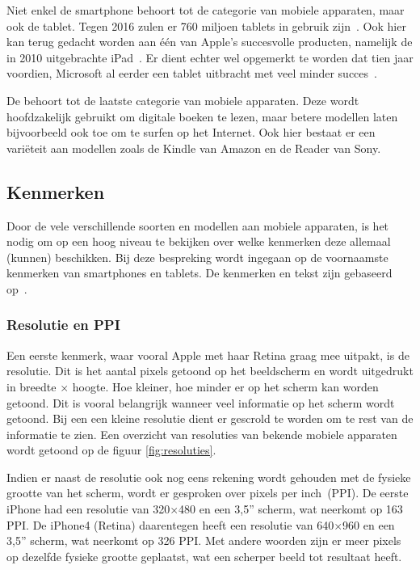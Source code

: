Niet enkel de smartphone behoort tot de categorie van mobiele apparaten, maar ook de tablet. 
Tegen 2016 zulen er 760 miljoen tablets in gebruik zijn~\cite{Gillett2012}.
Ook hier kan terug gedacht worden aan één van Apple's succesvolle producten, namelijk de in 2010 uitgebrachte iPad~\cite{Apple2010}. 
Er dient echter wel opgemerkt te worden dat tien jaar voordien, Microsoft al eerder een tablet uitbracht met veel minder succes~\cite{Microsoft2000}.

De  behoort tot de laatste categorie van mobiele apparaten. 
Deze wordt hoofdzakelijk gebruikt om digitale boeken te lezen, maar betere modellen laten bijvoorbeeld ook toe om te surfen op het Internet. 
Ook hier bestaat er een variëteit aan modellen zoals de Kindle van Amazon en de Reader van Sony.

\subsection{Kenmerken}
Door de vele verschillende soorten en modellen aan mobiele apparaten, is het nodig om op een hoog niveau te bekijken over welke kenmerken deze allemaal (kunnen) beschikken. 
Bij deze bespreking wordt ingegaan op de voornaamste kenmerken van smartphones en tablets. 
De kenmerken en tekst zijn gebaseerd op~\cite{PhilDutson2012}.

\subsubsection{Resolutie en PPI}
Een eerste kenmerk, waar vooral Apple met haar Retina graag mee uitpakt, is de resolutie. 
Dit is het aantal pixels getoond op het beeldscherm en wordt uitgedrukt in breedte $\times$ hoogte. 
Hoe kleiner, hoe minder er op het scherm kan worden getoond. 
Dit is vooral belangrijk wanneer veel informatie op het scherm wordt getoond. 
Bij een een kleine resolutie dient er gescrold te worden om te rest van de informatie te zien.
Een overzicht van resoluties van bekende mobiele apparaten wordt getoond op de figuur \ref{fig:resoluties}.

Indien er naast de resolutie ook nog eens rekening wordt gehouden met de fysieke grootte van het scherm, wordt er gesproken over pixels per inch~(PPI). 
De eerste iPhone had een resolutie van 320$\times$480 en een 3,5” scherm, wat neerkomt op 163 PPI. 
De iPhone4 (Retina) daarentegen heeft een resolutie van 640$\times$960 en een 3,5” scherm, wat neerkomt op 326 PPI. 
Met andere woorden zijn er meer pixels op dezelfde fysieke grootte geplaatst, wat een scherper beeld tot resultaat heeft. 


